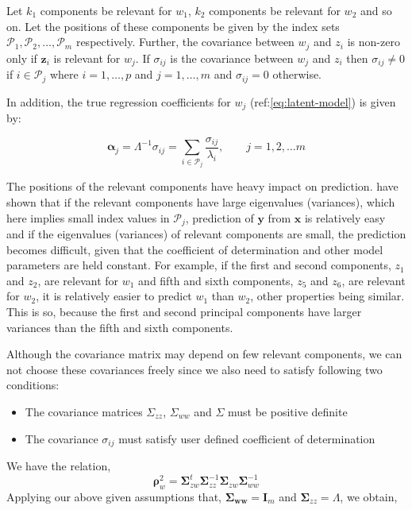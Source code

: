 \documentclass[3p,times,12pt,authoryear]{elsarticle}
\providecommand{\tightlist}{%
  \setlength{\itemsep}{0pt}\setlength{\parskip}{0pt}}
\theoremstyle{definition}
\theoremstyle{definition}
\theoremstyle{remark}
\begin{document}
Let \(k_1\) components be relevant for \(w_1\), \(k_2\) components be
relevant for \(w_2\) and so on. Let the positions of these components be
given by the index sets
\(\mathcal{P}_1, \mathcal{P}_2, \ldots, \mathcal{P}_m\) respectively.
Further, the covariance between \(w_j\) and \(z_i\) is non-zero only if
\(\mathbf{z}_i\) is relevant for \(w_j\). If \(\sigma_{ij}\) is the
covariance between \(w_j\) and \(z_i\) then \(\sigma_{ij} \ne 0\) if
\(i \in \mathcal{P}_j\) where \(i = 1, \ldots, p\) and
\(j = 1, \ldots, m\) and \(\sigma_{ij} = 0\) otherwise.

In addition, the true regression coefficients for \(w_j\)
(ref:\eqref{eq:latent-model}) is given by:

\[
\boldsymbol{\alpha}_j = \Lambda^{-1} \sigma_{ij} = \sum_{i \in \mathcal{P}_j}\frac{\sigma_{ij}}{\lambda_i},\qquad j = 1, 2, \ldots m
\]

The positions of the relevant components have heavy impact on
prediction. \citet{helland1994comparison} have shown that if the
relevant components have large eigenvalues (variances), which here
implies small index values in \(\mathcal{P}_j\), prediction of
\(\mathbf{y}\) from \(\mathbf{x}\) is relatively easy and if the
eigenvalues (variances) of relevant components are small, the prediction
becomes difficult, given that the coefficient of determination and other
model parameters are held constant. For example, if the first and second
components, \(z_1\) and \(z_2\), are relevant for \(w_1\) and fifth and
sixth components, \(z_5\) and \(z_6\), are relevant for \(w_2\), it is
relatively easier to predict \(w_1\) than \(w_2\), other properties
being similar. This is so, because the first and second principal
components have larger variances than the fifth and sixth components.

Although the covariance matrix may depend on few relevant components, we
can not choose these covariances freely since we also need to satisfy
following two conditions:

\begin{itemize}
\tightlist
\item
  The covariance matrices \(\Sigma_{zz}\), \(\Sigma_{ww}\) and
  \(\Sigma\) must be positive definite
\item
  The covariance \(\sigma_{ij}\) must satisfy user defined coefficient
  of determination
\end{itemize}

We have the relation,
\[\boldsymbol{\rho}_w^2 = \boldsymbol{\Sigma}_{zw}^t\boldsymbol{\Sigma}_{zz}^{-1}\boldsymbol{\Sigma}_{zw}\boldsymbol{\Sigma}_{ww}^{-1}\]
Applying our above given assumptions that,
\(\boldsymbol{\Sigma_{ww}} = \mathbf{I}_m\) and
\(\boldsymbol{\Sigma}_{zz} = \Lambda\), we obtain,
\end{document}
